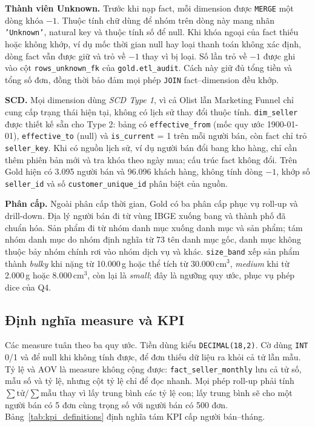\documentclass[a4paper]{article}
\begin{document}
\textbf{Thành viên Unknown.} Trước khi nạp fact, mỗi dimension được \texttt{MERGE} một dòng khóa $-1$. Thuộc tính chữ dùng để nhóm trên dòng này mang nhãn \texttt{'Unknown'}, natural key và thuộc tính số để null. Khi khóa ngoại của fact thiếu hoặc không khớp, ví dụ mốc thời gian null hay loại thanh toán không xác định, dòng fact vẫn được giữ và trỏ về $-1$ thay vì bị loại. Số lần trỏ về $-1$ được ghi vào cột \texttt{rows\_unknown\_fk} của \texttt{gold.etl\_audit}. Cách này giữ đủ tổng tiền và tổng số đơn, đồng thời bảo đảm mọi phép \texttt{JOIN} fact--dimension đều khớp.

\textbf{SCD.} Mọi dimension dùng \textit{SCD Type 1}, vì cả Olist lẫn Marketing Funnel chỉ cung cấp trạng thái hiện tại, không có lịch sử thay đổi thuộc tính. \texttt{dim\_seller} được thiết kế sẵn cho Type 2: bảng có \texttt{effective\_from} (mốc quy ước 1900-01-01), \texttt{effective\_to} (null) và \texttt{is\_current} = 1 trên mỗi người bán, còn fact chỉ trỏ \texttt{seller\_key}. Khi có nguồn lịch sử, ví dụ người bán đổi bang kho hàng, chỉ cần thêm phiên bản mới và tra khóa theo ngày mua; cấu trúc fact không đổi. Trên Gold hiện có 3.095 người bán và 96.096 khách hàng, không tính dòng $-1$, khớp số \texttt{seller\_id} và số \texttt{customer\_unique\_id} phân biệt của nguồn.

\textbf{Phân cấp.} Ngoài phân cấp thời gian, Gold có ba phân cấp phục vụ roll-up và drill-down. Địa lý người bán đi từ vùng IBGE xuống bang và thành phố đã chuẩn hóa. Sản phẩm đi từ nhóm danh mục xuống danh mục và sản phẩm; tám nhóm danh mục do nhóm định nghĩa từ 73 tên danh mục gốc, danh mục không thuộc bảy nhóm chính rơi vào nhóm dịch vụ và khác. \texttt{size\_band} xếp sản phẩm thành \textit{bulky} khi nặng từ 10.000\,g hoặc thể tích từ 30.000\,cm$^3$, \textit{medium} khi từ 2.000\,g hoặc 8.000\,cm$^3$, còn lại là \textit{small}; đây là ngưỡng quy ước, phục vụ phép dice của Q4.

\subsection{Định nghĩa measure và KPI}
\label{subsec:4_3}

Các measure tuân theo ba quy ước. Tiền dùng kiểu \texttt{DECIMAL(18,2)}. Cờ dùng \texttt{INT} 0/1 và để null khi không tính được, để đơn thiếu dữ liệu ra khỏi cả tử lẫn mẫu. Tỷ lệ và AOV là measure không cộng được: \texttt{fact\_seller\_monthly} lưu cả tử số, mẫu số và tỷ lệ, nhưng cột tỷ lệ chỉ để đọc nhanh. Mọi phép roll-up phải tính $\sum \text{tử} / \sum \text{mẫu}$ thay vì lấy trung bình các tỷ lệ con; lấy trung bình sẽ cho một người bán có 5 đơn cùng trọng số với người bán có 500 đơn. Bảng~\ref{tab:kpi_definitions} định nghĩa tám KPI cấp người bán--tháng.
\end{document}
